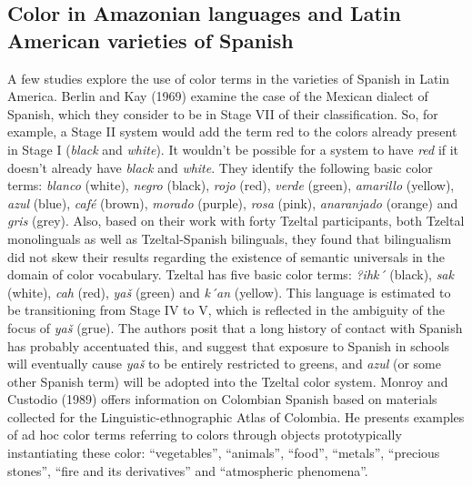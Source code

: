 \documentclass[
  english,
  ,man,floatsintext]{apa6}
\begin{document}
\hypertarget{color-in-amazonian-languages-and-latin-american-varieties-of-spanish}{%
\subsection{Color in Amazonian languages and Latin American varieties of Spanish}\label{color-in-amazonian-languages-and-latin-american-varieties-of-spanish}}

A few studies explore the use of color terms in the varieties of Spanish in Latin America. Berlin and Kay (1969) examine the case of the Mexican dialect of Spanish, which they consider to be in Stage VII of their classification. So, for example, a Stage II system would add the term red to the colors already present in Stage I (\emph{black} and \emph{white}). It wouldn't be possible for a system to have \emph{red} if it doesn't already have \emph{black} and \emph{white}. They identify the following basic color terms: \emph{blanco} (white), \emph{negro} (black), \emph{rojo} (red), \emph{verde} (green), \emph{amarillo} (yellow), \emph{azul} (blue), \emph{café} (brown), \emph{morado} (purple), \emph{rosa} (pink), \emph{anaranjado} (orange) and \emph{gris} (grey). Also, based on their work with forty Tzeltal participants, both Tzeltal monolinguals as well as Tzeltal-Spanish bilinguals, they found that bilingualism did not skew their results regarding the existence of semantic universals in the domain of color vocabulary. Tzeltal has five basic color terms: \emph{?ihk´} (black), \emph{sak} (white), \emph{cah} (red), \emph{yaš} (green) and \emph{k´an} (yellow). This language is estimated to be transitioning from Stage IV to V, which is reflected in the ambiguity of the focus of \emph{yaš} (grue). The authors posit that a long history of contact with Spanish has probably accentuated this, and suggest that exposure to Spanish in schools will eventually cause \emph{yaš} to be entirely restricted to greens, and \emph{azul} (or some other Spanish term) will be adopted into the Tzeltal color system.
Monroy and Custodio (1989) offers information on Colombian Spanish based on materials collected for the Linguistic-ethnographic Atlas of Colombia. He presents examples of ad hoc color terms referring to colors through objects prototypically instantiating these color: \enquote{vegetables}, \enquote{animals}, \enquote{food}, \enquote{metals}, \enquote{precious stones}, \enquote{fire and its derivatives} and \enquote{atmospheric phenomena}.
\end{document}
